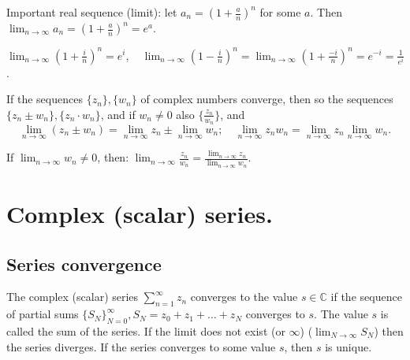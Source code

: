 Important real sequence (limit): let $a_n = (1 + \frac{a}{n})^n$ for some $a$. Then $\lim_{n \to \infty} a_n = (1 + \frac{a}{n})^n = e^a$.

\begin{example}\label{example:12.4} $\lim_{n \to \infty} (1 + \frac{i}{n})^n = e^i, \quad \lim_{n \to \infty} (1 - \frac{i}{n})^n = \lim_{n \to \infty} (1 + \frac{-i}{n})^n = e^{-i} = \frac{1}{e^i}$.
\end{example}

\begin{proposition}  
    If the sequences $\{z_n\}, \{w_n\}$ of complex numbers converge, then so the sequences $\{z_n \pm w_n\}, \{z_n \cdot w_n\}$, 
    and if $w_n \neq 0$ also $\{\frac{z_n}{w_n}\}$, and 
    \[\lim_{n \to \infty} (z_n \pm w_n) = \lim_{n \to \infty} z_n \pm \lim_{n \to \infty} w_n; \quad \lim_{n \to \infty} z_n w_n = \lim_{n \to \infty} z_n \lim_{n \to \infty} w_n.\]

If $\lim_{n \to \infty} w_n \neq 0$, then: $\lim_{n \to \infty} \frac{z_n}{w_n} = \frac{\lim_{n \to \infty} z_n}{\lim_{n \to \infty} w_n}$.
\end{proposition}

\section{Complex (scalar) series.}

\subsection{Series convergence}

\begin{definition}\label{definition:11.1} 
    The complex (scalar) series $\sum_{n=1}^{\infty} z_n$ converges to the value $s \in \mathbb{C}$ if the sequence of partial sums $\{S_N\}_{N=0}^{\infty}, S_N = z_0 + z_1 + \dots + z_N$ converges to $s$. 
    The value $s$ is called the sum of the series. If the limit does not exist (or $\infty$) ($\lim_{N \to \infty} S_N$) then the series diverges. If the series converges to some value $s$, then $s$ is unique.
\end{definition}

